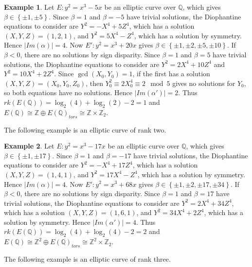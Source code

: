 \documentclass{article}
\newcommand{\Z}{\mathbb{Z}}
\newcommand{\Q}{\mathbb{Q}}
\newcommand{\rb}[1]{\left( #1 \right)}
\newcommand{\cb}[1]{\left\{ #1 \right\}}
\newcommand{\abs}[1]{\left\lvert #1 \right\rvert}
\theoremstyle{definition}
\newtheorem*{example}{Example}
\begin{document}
\begin{example}
Let $ E : y^2 = x^3 - 5x $ be an elliptic curve over $ \Q $, which gives $ \beta \in \cb{\pm 1, \pm 5} $. Since $ \beta = 1 $ and $ \beta = -5 $ have trivial solutions, the Diophantine equations to consider are $ Y^2 = -X^4 + 5Z^4 $, which has a solution $ \rb{X, Y, Z} = \rb{1, 2, 1} $, and $ Y^2 = 5X^4 - Z^4 $, which has a solution by symmetry. Hence $ \abs{Im\rb{\alpha}} = 4 $. Now $ E' : y^2 = x^3 + 20x $ gives $ \beta \in \cb{\pm 1, \pm 2, \pm 5, \pm 10} $. If $ \beta < 0 $, there are no solutions by sign disparity. Since $ \beta = 1 $ and $ \beta = 5 $ have trivial solutions, the Diophantine equations to consider are $ Y^2 = 2X^4 + 10Z^4 $ and $ Y^2 = 10X^4 + 2Z^4 $. Since $ \gcd\rb{X_0, Y_0} = 1 $, if the first has a solution $ \rb{X, Y, Z} = \rb{X_0, Y_0, Z_0} $, then $ Y_0^2 \equiv 2X_0^4 \equiv 2 \mod 5 $ gives no solutions for $ Y_0 $, so both equations have no solutions. Hence $ \abs{Im\rb{\alpha'}} = 2 $. Thus $ rk\rb{E\rb{\Q}} = \log_2\rb{4} + \log_2\rb{2} - 2 = 1 $ and $ E\rb{\Q} \cong \Z \oplus E\rb{\Q}_{tors} \cong \Z \times \Z_2 $.
\end{example}

The following example is an elliptic curve of rank two.

\begin{example}
Let $ E : y^2 = x^3 - 17x $ be an elliptic curve over $ \Q $, which gives $ \beta \in \cb{\pm 1, \pm 17} $. Since $ \beta = 1 $ and $ \beta = -17 $ have trivial solutions, the Diophantine equations to consider are $ Y^2 = -X^4 + 17Z^4 $, which has a solution $ \rb{X, Y, Z} = \rb{1, 4, 1} $, and $ Y^2 = 17X^4 - Z^4 $, which has a solution by symmetry. Hence $ \abs{Im\rb{\alpha}} = 4 $. Now $ E' : y^2 = x^3 + 68x $ gives $ \beta \in \cb{\pm 1, \pm 2, \pm 17, \pm 34} $. If $ \beta < 0 $, there are no solutions by sign disparity. Since $ \beta = 1 $ and $ \beta = 17 $ have trivial solutions, the Diophantine equations to consider are $ Y^2 = 2X^4 + 34Z^4 $, which has a solution $ \rb{X, Y, Z} = \rb{1, 6, 1} $, and $ Y^2 = 34X^4 + 2Z^4 $, which has a solution by symmetry. Hence $ \abs{Im\rb{\alpha'}} = 4 $. Thus $ rk\rb{E\rb{\Q}} = \log_2\rb{4} + \log_2\rb{4} - 2 = 2 $ and $ E\rb{\Q} \cong \Z^2 \oplus E\rb{\Q}_{tors} \cong \Z^2 \times \Z_2 $.
\end{example}

The following example is an elliptic curve of rank three.
\end{document}
